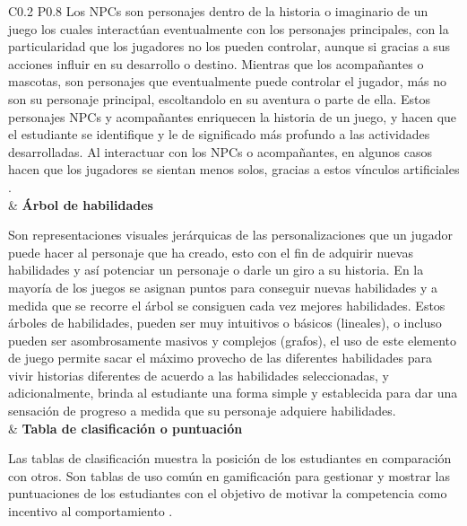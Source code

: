 \begin{longtable}{C{0.2\linewidth} P{0.8\linewidth}}
Los NPCs son personajes dentro de la historia o imaginario de un juego los cuales interactúan eventualmente
con los personajes principales, con la particularidad que los jugadores  no los pueden controlar, aunque si
gracias a sus acciones influir en su desarrollo o destino. Mientras que los acompañantes o mascotas, son 
personajes que eventualmente puede controlar el jugador, más no son su personaje principal, escoltandolo en su 
aventura o parte de ella. Estos personajes NPCs y acompañantes enriquecen la historia de un juego, y hacen que 
el estudiante se identifique y le de significado más profundo a las actividades desarrolladas. Al interactuar 
con los NPCs o acompañantes, en algunos casos hacen que los jugadores se sientan menos solos, gracias a estos 
vínculos artificiales \cite{13034670820180801}.
\\
& \textbf{Árbol de habilidades}

Son representaciones visuales jerárquicas de las personalizaciones que un jugador puede hacer al personaje que
ha creado, esto con el fin de adquirir nuevas habilidades y así potenciar un personaje o darle un giro a su
historia. En la mayoría de los juegos se asignan puntos para conseguir nuevas habilidades y a medida que se
recorre el árbol se consiguen cada vez mejores habilidades. Estos árboles de habilidades, pueden ser muy 
intuitivos o básicos (lineales), o incluso pueden ser asombrosamente masivos y complejos (grafos), el uso de
este elemento de juego permite sacar el máximo provecho de las diferentes habilidades para vivir historias 
diferentes de acuerdo a las habilidades seleccionadas, y adicionalmente, brinda al estudiante una forma simple 
y establecida para dar una sensación de progreso a medida que su personaje adquiere habilidades.
\\
 & \textbf{Tabla de clasificación o puntuación}

Las tablas de clasificación muestra la posición de los estudiantes en comparación con otros. Son tablas de uso
común en gamificación para gestionar y mostrar las puntuaciones de los estudiantes con el objetivo de motivar 
la competencia como incentivo al comportamiento \cite{DAROCHASEIXAS201648}.


\end{longtable}
